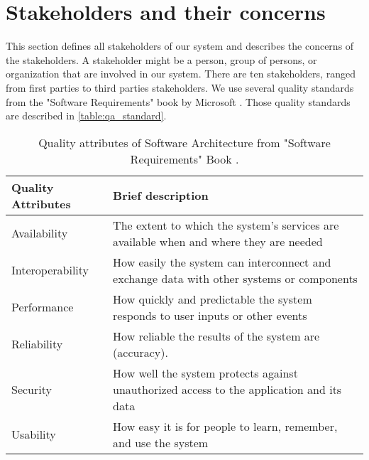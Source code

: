 \section{Stakeholders and their concerns}



This section defines all stakeholders of our system and describes the concerns of the stakeholders. A stakeholder might be a person, group of persons, or organization that are involved in our system. There are ten stakeholders, ranged from first parties to third parties stakeholders. We use several quality standards from the "Software Requirements" book by Microsoft \cite{wiegers2013software}. Those quality standards are described in \autoref{table:qa_standard}.

\begin{table}[!htbp] \centering
	\caption{Quality attributes of Software Architecture from "Software Requirements" Book \cite{wiegers2013software}.}
	\label{table:qa_standard}
	\begin{tabular}{L{} L{}}
		\toprule
		\textbf{Quality Attributes} & \textbf{Brief description}                                                                                        \\ \midrule
		Availability                & The extent to which the system's services are available when and where they are needed                            \\
		Interoperability            & How easily the system can interconnect and exchange data with other systems or components                         \\
		Performance                 & How quickly and predictable the system responds to user inputs or other events                                    \\
		Reliability                 & How reliable the results of the system are (accuracy). \\
		Security                    & How well the system protects against unauthorized access to the application and its data                          \\
		Usability                   & How easy it is for people to learn, remember, and use the system                                                  \\
		\bottomrule
	\end{tabular}
\end{table}

